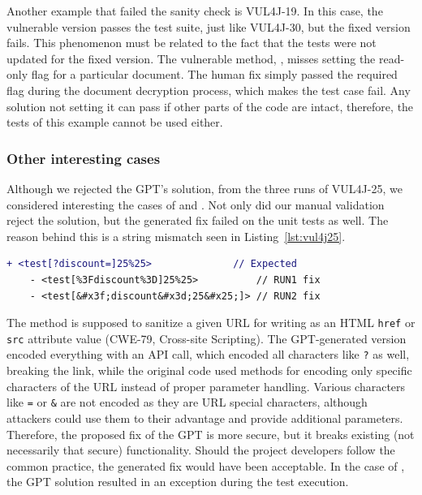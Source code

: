 Another example that failed the sanity check is VUL4J-19.
In this case, the vulnerable version passes the test suite, just like VUL4J-30, but the fixed version fails.
This phenomenon must be related to the fact that the tests were not updated for the fixed version.
The vulnerable method, , misses setting the read-only flag for a particular document.
The human fix simply passed the required flag during the document decryption process, which makes the test case fail.
Any solution not setting it can pass if other parts of the code are intact, therefore, the tests of this example cannot be used either.

\subsubsection{Other interesting cases}
\label{sec:discussion:interesting}
Although we rejected the GPT's solution, from the three runs of VUL4J-25, we considered interesting the cases of  and .
Not only did our manual validation reject the solution, but the generated fix failed on the unit tests as well.
The reason behind this is a string mismatch seen in Listing~\ref{lst:vul4j25}.

\begin{lstlisting}[caption={Expected and obtained return values for VUL4J-25}, label=lst:vul4j25, captionpos=b, breaklines=true, keepspaces=true, language=diff]
	+ <test[?discount=]25%25>              // Expected
	- <test[%3Fdiscount%3D]25%25>          // RUN1 fix
	- <test[&#x3f;discount&#x3d;25&#x25;]> // RUN2 fix
\end{lstlisting}

The  method is supposed to sanitize a given URL for writing as an HTML \verb|href| or \verb|src| attribute value (CWE-79, Cross-site Scripting).
The GPT-generated version encoded everything with an API call, which encoded all characters like \verb|?| as well, breaking the link, while the original code used  methods for encoding only specific characters of the URL instead of proper parameter handling.
Various characters like \verb|=| or \verb|&| are not encoded as they are URL special characters, although attackers could use them to their advantage and provide additional parameters.
Therefore, the proposed fix of the GPT is more secure, but it breaks existing (not necessarily that secure) functionality.
Should the project developers follow the common practice, the generated fix would have been acceptable.
In the case of , the GPT solution resulted in an exception during the test execution.

